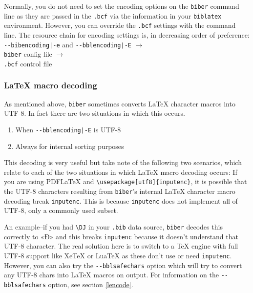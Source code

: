 \documentclass{ltxdockit}
\begin{document}
\noindent Normally, you do not need to set the encoding options on the
\verb+biber+ command line as they are passed in the \verb+.bcf+ via the
information in your \verb+biblatex+ environment. However, you can override
the \verb+.bcf+ settings with the command line. The resource chain for
encoding settings is, in decreasing order
of preference:\\[2ex]

\noindent\verb+--bibencoding|-e+ and \verb+--bblencoding|-E+ $\rightarrow$\\
\hspace*{1em}\verb+biber+ config file $\rightarrow$\\
\hspace*{2em}\verb+.bcf+ control file

\subsubsection{LaTeX macro decoding}\label{ldecode}

\noindent As mentioned above, \verb+biber+ sometimes converts LaTeX
character macros into UTF-8. In fact there are two situations in which
this occurs.

\begin{enumerate}
\item When \verb+--bblencoding|-E+ is UTF-8
\item Always for internal sorting purposes
\end{enumerate}

\noindent This decoding is very useful but take note of the following
two scenarios, which relate to each of the two situations in which
LaTeX macro decoding occurs:
\bigskip
{}
If you are using PDFLaTeX and \verb+\usepackage[utf8]{inputenc}+, it
is possible that the UTF-8 characters resulting from \verb+biber+'s
internal LaTeX character macro decoding break \verb+inputenc+. This is
because \verb+inputenc+ does not implement all of UTF-8, only a
commonly used subset.

An example--if you had \verb+\DJ+ in your \verb+.bib+ data source,
\verb+biber+ decodes this correctly to «Đ» and this breaks \verb+inputenc+
because it doesn't understand that UTF-8 character. The real solution here
is to switch to a TeX engine with full UTF-8 support like XeTeX or LuaTeX
as these don't use or need \verb+inputenc+. However, you can also try the
\verb+--bblsafechars+ option which will try to convert any UTF-8 chars into
LaTeX macros on output. For information on the \verb+--bblsafechars+
option, see section \ref{lencode}.
\bigskip
{}
\end{document}

